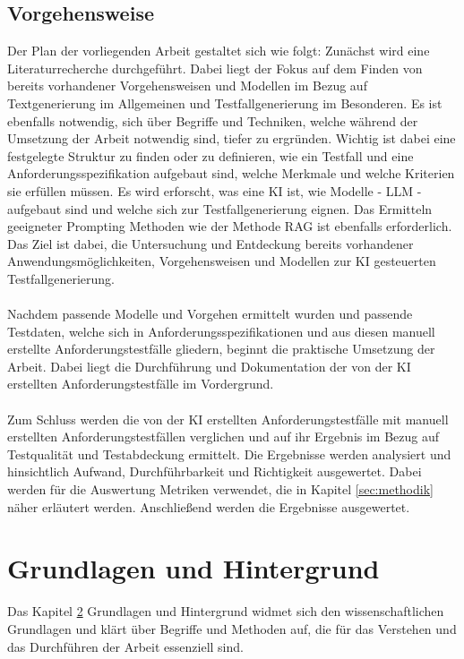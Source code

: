\documentclass[12pt,toc=bib,toc=listof]{scrreprt}
\begin{document}
\section{Vorgehensweise} %
\label{sec:vorgehensweise}
Der Plan der vorliegenden Arbeit gestaltet sich wie folgt: Zunächst wird eine Literaturrecherche durchgeführt. Dabei liegt der Fokus auf dem Finden von bereits vorhandener Vorgehensweisen und Modellen im Bezug auf Textgenerierung im Allgemeinen und Testfallgenerierung im Besonderen. Es ist ebenfalls notwendig, sich über Begriffe und Techniken, welche während der Umsetzung der Arbeit notwendig sind, tiefer zu ergründen. Wichtig ist dabei eine festgelegte Struktur zu finden oder zu definieren, wie ein Testfall und eine Anforderungsspezifikation aufgebaut sind, welche Merkmale und welche Kriterien sie erfüllen müssen. Es wird erforscht, was eine KI ist, wie Modelle - LLM - aufgebaut sind und welche sich zur Testfallgenerierung eignen. Das Ermitteln geeigneter Prompting Methoden wie der Methode RAG ist ebenfalls erforderlich. Das Ziel ist dabei, die Untersuchung und Entdeckung bereits vorhandener Anwendungsmöglichkeiten, Vorgehensweisen und Modellen zur KI gesteuerten Testfallgenerierung.\\
\\
Nachdem passende Modelle und Vorgehen ermittelt wurden und passende Testdaten, welche sich in Anforderungsspezifikationen und aus diesen manuell erstellte Anforderungstestfälle gliedern, beginnt die praktische Umsetzung der Arbeit. Dabei liegt die Durchführung und Dokumentation der von der KI erstellten Anforderungstestfälle im Vordergrund.\\
\\
Zum Schluss werden die von der KI erstellten Anforderungstestfälle mit manuell erstellten Anforderungstestfällen verglichen und auf ihr Ergebnis im Bezug auf Testqualität und Testabdeckung ermittelt. Die Ergebnisse werden analysiert und hinsichtlich Aufwand, Durchführbarkeit und Richtigkeit ausgewertet. Dabei werden für die Auswertung Metriken verwendet, die in Kapitel \ref{sec:methodik} näher erläutert werden. Anschließend werden die Ergebnisse ausgewertet.

\chapter{Grundlagen und Hintergrund} %
\label{sec:grundlagenUndHintergrund}
Das Kapitel \ref{sec:grundlagenUndHintergrund} Grundlagen und Hintergrund widmet sich den wissenschaftlichen Grundlagen und klärt über Begriffe und Methoden auf, die für das Verstehen und das Durchführen der Arbeit essenziell sind.
\end{document}
